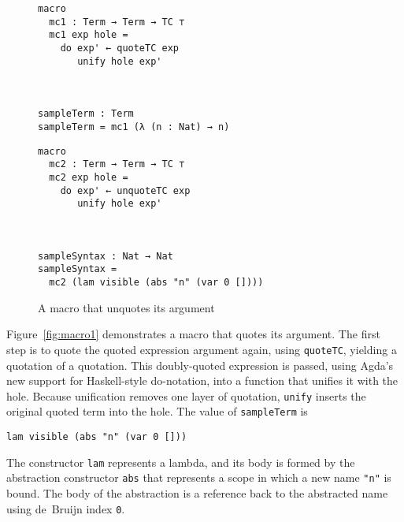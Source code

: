\documentclass[runningheads]{llncs}
\begin{document}
\begin{figure}[t]
\centering
\begin{minipage}{.5\textwidth}
\centering
\begingroup
\fontsize{7.9pt}{2pt}\selectfont
\begin{Verbatim}
macro
  mc1 : Term → Term → TC ⊤
  mc1 exp hole =
    do exp' ← quoteTC exp
       unify hole exp'



sampleTerm : Term
sampleTerm = mc1 (λ (n : Nat) → n)
\end{Verbatim}
\endgroup
{}
\label{fig:macro1}
\end{minipage}%
\begin{minipage}{.5\textwidth}
\centering
\begingroup
\fontsize{7.9pt}{2pt}\selectfont
\centering
\begin{Verbatim}
macro
  mc2 : Term → Term → TC ⊤
  mc2 exp hole =
    do exp' ← unquoteTC exp
       unify hole exp'



sampleSyntax : Nat → Nat
sampleSyntax =
  mc2 (lam visible (abs "n" (var 0 [])))
\end{Verbatim}
\endgroup
\caption{A macro that unquotes its argument}
\label{fig:macro2}
\end{minipage}
\end{figure}

%

Figure~\ref{fig:macro1} demonstrates a macro that quotes its argument.
The first step is to quote the quoted expression argument again, using \texttt{quoteTC}, yielding a quotation of a quotation.
This doubly-quoted expression is passed, using Agda's new support for Haskell-style do-notation, into a function that unifies it with the hole.
Because unification removes one layer of quotation, \texttt{unify} inserts the original quoted term into the hole.
The value of {\tt sampleTerm} is
\begin{center}
\begin{BVerbatim}
lam visible (abs "n" (var 0 []))
\end{BVerbatim}
\end{center}
The constructor \texttt{lam} represents a lambda, and its body is formed by the abstraction constructor \texttt{abs} that represents a scope in which a new name \texttt{"n"} is bound.
The body of the abstraction is a reference back to the abstracted name using de~Bruijn index \texttt{0}.
\end{document}
